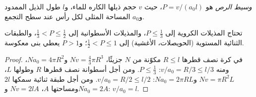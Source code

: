 \begin{definition}\label{def:b3:colloids:packing}
\emph{وسيط الرص}  هو $P =
v/(a_0l)$، حيث $v$ حجم ذيلها الكاره للماء، و$l$ طول
الذيل الممدود و$a_0$ المساحة المثلى لكل رأس عند سطح
التجمع.
\end{definition}

\begin{proposition}\label{prop:b3:colloids:packing}
تحتاج المذيلات الكروية إلى $P \le \frac13$، والمذيلات الأسطوانية إلى $\frac13 < P \le \frac12$، والطبقات الثنائية المستوية
(الحويصلات، الأغشية) إلى $\frac12 < P \le 1$؛ و$P > 1$ يعطي بنى معكوسة.
\end{proposition}

\begin{proof}
في كرة نصف قطرها $R \le l$ مكوّنة من $N$ جزيئًا، $Nv = \frac43\pi R^3$ و$Na_0 = 4\pi R^2$، ومنه
$v/a_0 = R/3 \le l/3$: $P \le \frac13$. ومن أجل أسطوانة نصف قطرها $R$ وطولها $L$، $Nv = \pi R^2L$ 
و$Na_0 = 2\pi RL$: $v/a_0 = R/2 \le l/2$. ومن أجل طبقة ثنائية سمكها $2l$ ومساحتها $A$، $Nv = 2lA$ 
و$Na_0 = 2A$: $v/a_0 = l$.
\end{proof}

